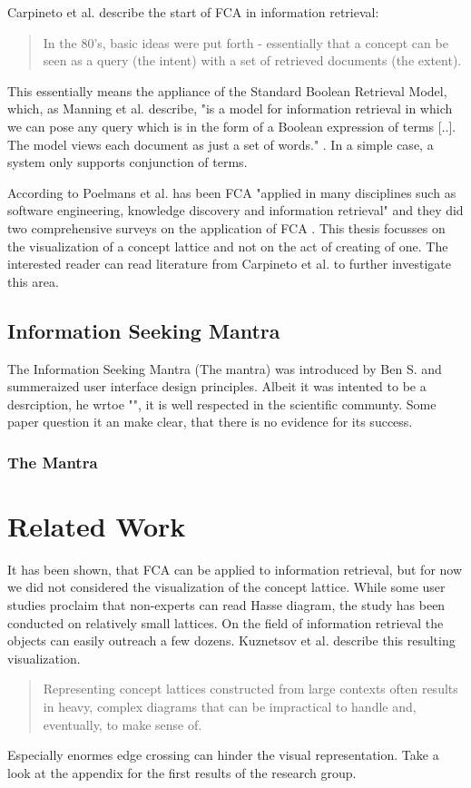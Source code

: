 \documentclass[11pt]{report}
\begin{document}
Carpineto et al.\cite{Carpineto2005} describe the start of FCA in information retrieval:

\begin{quote}
In the 80's, basic ideas were put forth - essentially that a concept can be seen as a query (the intent) with a set of retrieved documents (the extent).
\end{quote}

This essentially means the appliance of the Standard Boolean Retrieval Model, which, as Manning et al. \cite{Manning2009} describe, "is a model for information retrieval in which we can pose any query which is in the form of a Boolean expression of terms [..]. The model views each document as just a set of words." . In a simple case, a system only supports conjunction of terms.

According to Poelmans et al. has been FCA "applied in many disciplines such as software engineering, knowledge discovery and information retrieval" \cite{Poelmans2013} and they did two comprehensive surveys on the application of FCA \cite{Poelmans2013, Poelmans2013b}. This thesis focusses on the visualization of a concept lattice and not on the act of creating of one. The interested reader can read literature from Carpineto et al. \cite{carpineto2004concept,Carpineto2005} to further investigate this area.

\section{Information Seeking Mantra}
The Information Seeking Mantra (The mantra) was introduced by Ben S. and summeraized user interface design principles. Albeit it was intented to be a desrciption, he wrtoe "", it is well respected in the scientific communty. Some paper question it an make clear, that there is no evidence for its success.
\subsection{The Mantra}




\chapter{Related Work}

It has been shown, that FCA can be applied to information retrieval, but for now we did not considered the visualization of the concept lattice. While some user studies proclaim that non-experts can read Hasse diagram\cite{Eklund2004}, the study has been conducted on relatively small lattices. On the field of information retrieval the objects can easily outreach a few dozens. Kuznetsov et al. \cite{Kuznetsov20072}  describe this resulting visualization.
\begin{quote}
Representing concept lattices constructed from large contexts often results in heavy, complex diagrams that can be impractical to handle and, eventually, to make sense of.	
\end{quote}
Especially enormes edge crossing can hinder the visual representation. Take a look at the appendix for the first results of the research group. 
\end{document}
